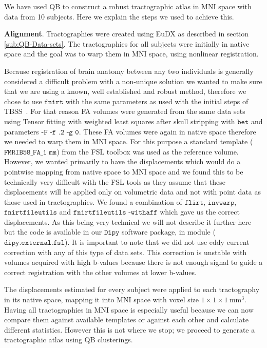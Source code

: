 \documentclass[journal]{IEEEtran}
\begin{document}
We have used QB to construct a robust tractographic atlas in MNI space
with data from 10 subjects. Here we explain the steps we used to achieve
this.

\textbf{Alignment}. Tractographies were created using EuDX as described
in section \ref{sub:QB-Data-sets}. The tractographies for all subjects
were initially in native space and the goal was to warp them in MNI
space, using nonlinear registration.

Because registration of brain anatomy between any two individuals is generally
considered a difficult problem with a non-unique solution we wanted to make sure
that we are using a known, well established and robust method, therefore we
chose to use $\texttt{fnirt}$ with the same parameters as used with the initial
steps of TBSS~\cite{Smith2006NeuroImage}. For that reason FA volumes were
generated from the same data sets using Tensor fitting with weighted least
squares after skull stripping with $\texttt{bet}$ and parameters $\texttt{-F -f
.2 -g 0}$. These FA volumes were again in native space therefore we needed to
warp them in MNI space. For this purpose a standard template
($\texttt{FMRIB58\_FA\_1~mm}$) from the FSL toolbox was used as the reference
volume. However, we wanted primarily to have the displacements which would do a
pointwise mapping from native space to MNI space and we found this to be
technically very difficult with the FSL tools as they assume that these
displacements will be applied only on volumetric data and not with point data as
those used in tractographies. We found a combination of $\texttt{flirt}$,
$\texttt{invwarp}$, $\texttt{fnirtfileutils}$ and $\texttt{fnirtfileutils
-withaff}$ which gave us the correct displacements. As this being very technical
we will not describe it further here but the code is available in our
$\texttt{Dipy}$ software package, in module ($\texttt{dipy.external.fsl}$). It
is important to note that we did not use eddy current correction with any of
this type of data sets. This correction is unstable with volumes acquired with
high b-values because there is not enough signal to guide a correct registration
with the other volumes at lower b-values.

The displacements estimated for every subject were applied
to each tractography in its native space, mapping it into MNI
space with voxel size $1\times1\times1~\textrm{mm}^{3}$. Having all
tractographies in MNI space is especially useful because we can now
compare them against available templates or against each other and
calculate different statistics. However this is not where we stop; we
proceed to generate a tractographic atlas using QB clusterings.
\end{document}
